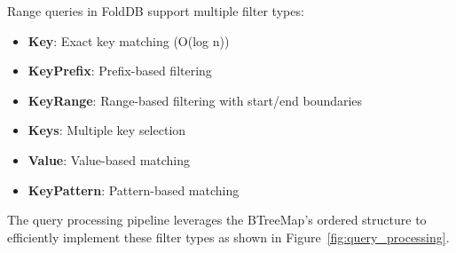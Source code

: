 \documentclass[11pt,a4paper]{article}
\begin{document}
Range queries in FoldDB support multiple filter types:

\begin{itemize}
\item \textbf{Key}: Exact key matching (O(log n))
\item \textbf{KeyPrefix}: Prefix-based filtering
\item \textbf{KeyRange}: Range-based filtering with start/end boundaries
\item \textbf{Keys}: Multiple key selection
\item \textbf{Value}: Value-based matching
\item \textbf{KeyPattern}: Pattern-based matching
\end{itemize}

The query processing pipeline leverages the BTreeMap's ordered structure to efficiently implement these filter types as shown in Figure~\ref{fig:query_processing}.
\end{document}
